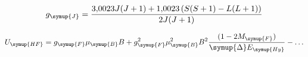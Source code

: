 \begin{equation}
  g_{\symup{J}}=\frac{\num{3.0023}J(J+1)+\num{1.0023}\left(S(S+1)-L(L+1)\right)}{2J(J+1)}
  \label{eq:gj}
\end{equation}

\begin{equation}
  U_{\symup{HF}}=g_{\symup{F}}\mu_{\symup{B}}B
  +g_{\symup{F}}^2\mu_{\symup{B}}^2B^2
  \frac{(1-2M_{\symup{F}})}{\symup{\Delta}E_{\symup{Hy}}}-\ldots
  \label{eq:zeemanenergie}
\end{equation}
